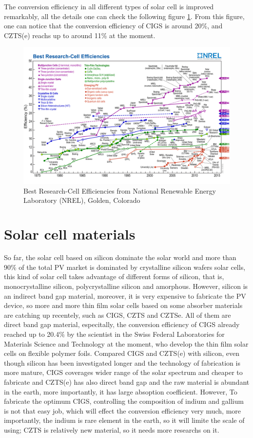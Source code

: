 \documentclass[a4paper, 12pt, titlepage,oneside,drop]{kthesis}
\begin{document}
The conversion efficiency in all different types of solar cell is improved remarkably, all the details one can check the following figure \ref{nrel}. 
From this figure, one can notice that the conversion efficiency of CIGS is around 20\%, and CZTS(e) reachs up to around 11\% at the moment.

\begin{figure}[H]
\centering
\includegraphics[scale=0.14]{efficiency_chart.jpg}
\caption{Best Research-Cell Efficiencies from National Renewable Energy Laboratory (NREL), Golden, Colorado}
\label{nrel}
\end{figure}


\section{Solar cell materials}
So far, the solar cell based on silicon dominate the solar world and more than 90\% of the total PV market is dominated by crystalline silicon wafers solar cells,
this kind of solar cell takes advantage of different forms of silicon, that is, monocrystalline silicon, polycrystalline silicon and amorphous. However, silicon is
an indirect band gap material, moreover, it is very expensive to fabricate the PV device, so more and more thin film solar cells based on some absorber materials
are catching up recentely, such as CIGS, CZTS and CZTSe. All of them are direct band gap material, especitally, the conversion efficiency of CIGS already reached
up to 20.4\% by the scientist in the Swiss Federal Laboratories for Materials Science and Technology at the moment, who develop the thin film solar cells on flexible
polymer foils. Compared CIGS and CZTS(e) with silicon, even though silicon has been investigated longer and the technology of fabrication is more mature,
CIGS coverages wider range of the solar spectrum and cheaper to fabricate and CZTS(e) has also direct band gap and the raw material is abundant in the earth, more
importantly, it has large absoption coefficient. However,  To fabricate the optimum CIGS, controlling the composition of indium and gallium is not that easy job, 
which will effect the conversion efficiency very much, more importantly, the indium is rare element in the earth, so it will limite the scale of using; CZTS is 
relatively new material, so it needs more researchs on it.
\end{document}

